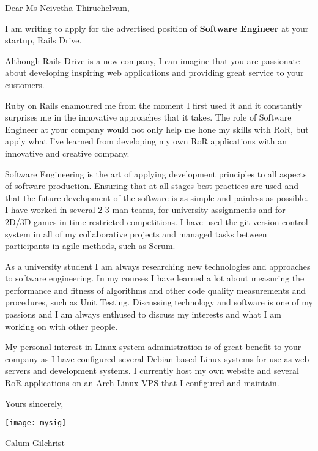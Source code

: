 
\setlength{\parskip}{0.5em}

Dear Ms Neivetha Thiruchelvam,

I am writing to apply for the advertised position of \textbf{Software
Engineer} at your startup, Rails Drive.

Although Rails Drive is a new company, I can imagine that you are passionate
about developing inspiring web applications and providing great service to your
customers.

Ruby on Rails enamoured me from the moment I first used it and it
constantly surprises me in the innovative approaches that it takes. The role of Software Engineer at your company would
not only help me hone my skills with RoR, but apply what I've learned from
developing my own RoR applications with an innovative and creative company.

Software Engineering is the art of applying development principles to all
aspects of software production. Ensuring that at all stages best practices are
used and that the future development of the software is as simple and painless
as possible. I have worked in several 2-3 man teams, for university assignments and for
2D/3D games in time restricted competitions. I have used the git version control
system in all of my collaborative projects and managed tasks between
participants in agile methods, such as Scrum.

As a university student I am always researching new technologies and
approaches to software engineering. In my courses I have learned a lot about
measuring the performance and fitness of algorithms and other code quality
measurements and procedures, such as Unit Testing.
Discussing technology and software is one of my passions and I am always
enthused to discuss my interests and what I am working on with other people.

My personal interest in Linux system administration is of great benefit to your
company as I have configured several Debian based Linux systems for use
as web servers and development systems.
I currently host my own website and several RoR applications on an Arch Linux
VPS that I configured and maintain.

\bigskip
Yours sincerely,

\texttt{[image: mysig]}

Calum Gilchrist
